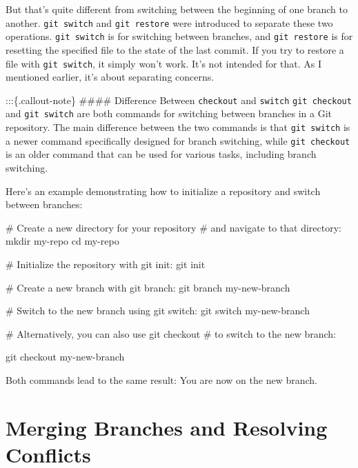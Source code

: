 \documentclass[
  letterpaper,
  DIV=11,
  numbers=noendperiod]{scrreprt}
\newenvironment{Shaded}{\begin{snugshade}}{\end{snugshade}}
\newcommand{\BuiltInTok}[1]{\textcolor[rgb]{0.00,0.23,0.31}{#1}}
\newcommand{\CommentTok}[1]{\textcolor[rgb]{0.37,0.37,0.37}{#1}}
\newcommand{\FunctionTok}[1]{\textcolor[rgb]{0.28,0.35,0.67}{#1}}
\newcommand{\NormalTok}[1]{\textcolor[rgb]{0.00,0.23,0.31}{#1}}
\begin{document}
But that's quite different from switching between the beginning of one
branch to another. \texttt{git\ switch} and \texttt{git\ restore} were
introduced to separate these two operations. \texttt{git\ switch} is for
switching between branches, and \texttt{git\ restore} is for resetting
the specified file to the state of the last commit. If you try to
restore a file with \texttt{git\ switch}, it simply won't work. It's not
intended for that. As I mentioned earlier, it's about separating
concerns.

:::\{.callout-note\} \#\#\#\# Difference Between \texttt{checkout} and
\texttt{switch} \texttt{git\ checkout} and \texttt{git\ switch} are both
commands for switching between branches in a Git repository. The main
difference between the two commands is that \texttt{git\ switch} is a
newer command specifically designed for branch switching, while
\texttt{git\ checkout} is an older command that can be used for various
tasks, including branch switching.

Here's an example demonstrating how to initialize a repository and
switch between branches:

\begin{Shaded}
\begin{Highlighting}[]
\CommentTok{\# Create a new directory for your repository}
\CommentTok{\# and navigate to that directory:}
\FunctionTok{mkdir}\NormalTok{ my{-}repo}
\BuiltInTok{cd}\NormalTok{ my{-}repo}

\CommentTok{\# Initialize the repository with git init:}
\FunctionTok{git}\NormalTok{ init}

\CommentTok{\# Create a new branch with git branch:}
\FunctionTok{git}\NormalTok{ branch my{-}new{-}branch}

\CommentTok{\# Switch to the new branch using git switch:}
\FunctionTok{git}\NormalTok{ switch my{-}new{-}branch}

\CommentTok{\# Alternatively, you can also use git checkout}
\CommentTok{\# to switch to the new branch:}

\FunctionTok{git}\NormalTok{ checkout my{-}new{-}branch}
\end{Highlighting}
\end{Shaded}

Both commands lead to the same result: You are now on the new branch.

\hypertarget{merging-branches-and-resolving-conflicts}{%
\section{Merging Branches and Resolving
Conflicts}\label{merging-branches-and-resolving-conflicts}}
\end{document}
